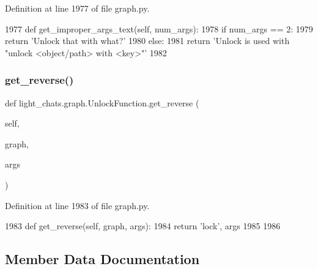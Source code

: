 Definition at line 1977 of file graph.\+py.


\begin{DoxyCode}
1977     \textcolor{keyword}{def }get\_improper\_args\_text(self, num\_args):
1978         \textcolor{keywordflow}{if} num\_args == 2:
1979             \textcolor{keywordflow}{return} \textcolor{stringliteral}{'Unlock that with what?'}
1980         \textcolor{keywordflow}{else}:
1981             \textcolor{keywordflow}{return} \textcolor{stringliteral}{'Unlock is used with "unlock <object/path> with <key>"'}
1982 
\end{DoxyCode}
\mbox{\label{classlight__chats_1_1graph_1_1UnlockFunction_a8527e0ee7a1f29a4daf4899451cdaa6f}} 
\subsubsection{\texorpdfstring{get\+\_\+reverse()}{get\_reverse()}}
{\footnotesize\ttfamily def light\+\_\+chats.\+graph.\+Unlock\+Function.\+get\+\_\+reverse (\begin{DoxyParamCaption}\item[{}]{self,  }\item[{}]{graph,  }\item[{}]{args }\end{DoxyParamCaption})}



Definition at line 1983 of file graph.\+py.


\begin{DoxyCode}
1983     \textcolor{keyword}{def }get\_reverse(self, graph, args):
1984         \textcolor{keywordflow}{return} \textcolor{stringliteral}{'lock'}, args
1985 
1986 
\end{DoxyCode}


\subsection{Member Data Documentation}
\mbox{\label{classlight__chats_1_1graph_1_1UnlockFunction_a8e80f007572fa2ce7624eca4ec645a56}} 
